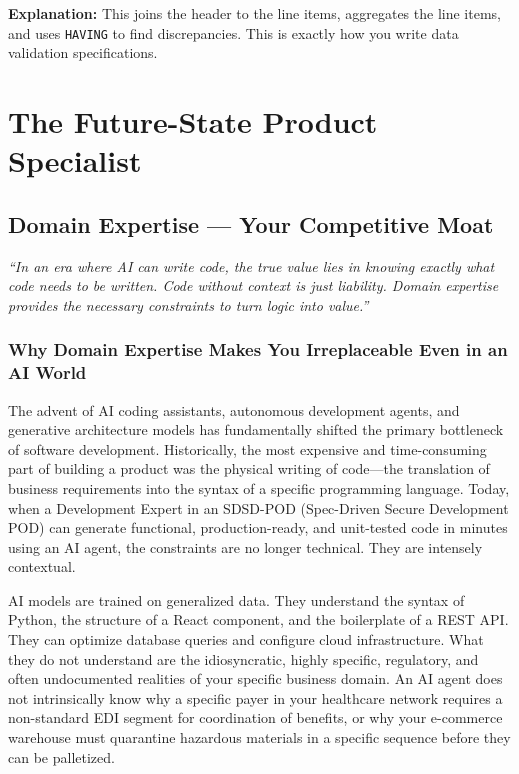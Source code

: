 \documentclass[
  11pt,
  openany,
  oneside]{book}
\renewenvironment{quote}{\begin{customquote}}{\end{customquote}}
\begin{document}
\textbf{Explanation:} This joins the header to the line items,
aggregates the line items, and uses \texttt{HAVING} to find
discrepancies. This is exactly how you write data validation
specifications.

\part{The Future-State Product Specialist}

\chapter{Domain Expertise --- Your Competitive
Moat}\label{domain-expertise-your-competitive-moat}

\begin{quote}
\emph{``In an era where AI can write code, the true value lies in
knowing exactly what code needs to be written. Code without context is
just liability. Domain expertise provides the necessary constraints to
turn logic into value.''}
\end{quote}

\section{Why Domain Expertise Makes You Irreplaceable Even in an AI
World}\label{why-domain-expertise-makes-you-irreplaceable-even-in-an-ai-world}

The advent of AI coding assistants, autonomous development agents, and
generative architecture models has fundamentally shifted the primary
bottleneck of software development. Historically, the most expensive and
time-consuming part of building a product was the physical writing of
code---the translation of business requirements into the syntax of a
specific programming language. Today, when a Development Expert in an
SDSD-POD (Spec-Driven Secure Development POD) can generate functional,
production-ready, and unit-tested code in minutes using an AI agent, the
constraints are no longer technical. They are intensely contextual.

AI models are trained on generalized data. They understand the syntax of
Python, the structure of a React component, and the boilerplate of a
REST API. They can optimize database queries and configure cloud
infrastructure. What they do not understand are the idiosyncratic,
highly specific, regulatory, and often undocumented realities of your
specific business domain. An AI agent does not intrinsically know why a
specific payer in your healthcare network requires a non-standard EDI
segment for coordination of benefits, or why your e-commerce warehouse
must quarantine hazardous materials in a specific sequence before they
can be palletized.
\end{document}
